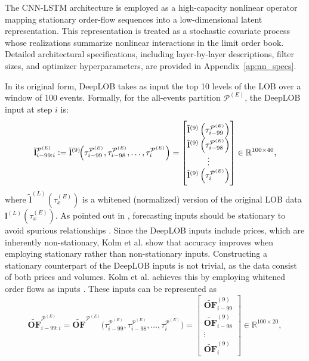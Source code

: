 \documentclass[10pt,a4paper,oneside]{article}
\begin{document}
The CNN-LSTM architecture is employed as a high-capacity nonlinear operator mapping stationary order-flow sequences into a low-dimensional latent representation. This representation is treated as a stochastic covariate process whose realizations summarize nonlinear interactions in the limit order book. Detailed architectural specifications, including layer-by-layer descriptions, filter sizes, and optimizer hyperparameters, are provided in Appendix~\ref{ap:nn_specs}.

In its original form, DeepLOB takes as input the top 10 levels of the LOB over a window of 100 events. Formally, for the all-events partition $\mathcal{P}^{(E)}$, the DeepLOB input at step $i$ is:
\[
    \tilde{\mathbf{l}}^{\mathcal{P}^{(E)}}_{i - 99 : i}
    :=
    \tilde{\mathbf{l}}^{(9)}\!\Bigl(\tau^{\mathcal{P}^{(E)}}_{i - 99}, \tau^{\mathcal{P}^{(E)}}_{i - 98}, \dots , \tau^{\mathcal{P}^{(E)}}_{i}\Bigr)
    =
    \begin{bmatrix}
        \tilde{\mathbf{l}}^{(9)}\left(\tau^{\mathcal{P}^{(E)}}_{i - 99}\right) \\
        \tilde{\mathbf{l}}^{(9)}\left(\tau^{\mathcal{P}^{(E)}}_{i - 98}\right) \\
        \vdots                                                                 \\
        \tilde{\mathbf{l}}^{(9)}\left(\tau^{\mathcal{P}^{(E)}}_{i}\right)
    \end{bmatrix}
    \in \mathbb{R}^{100 \times 40},
\]
where $\tilde{\mathbf{l}}^{(L)}(\tau^{(E)}_x)$ is a whitened (normalized) version of the original LOB data $\mathbf{l}^{(L)}(\tau^{(E)}_x)$. As pointed out in \cite{kolm2023deep}, forecasting inputs should be stationary to avoid spurious relationships \cite{granger1974spurious, phillips1986understanding}. Since the DeepLOB inputs include prices, which are inherently non-stationary, Kolm et al. \cite{kolm2023deep} show that accuracy improves when employing stationary rather than non-stationary inputs. Constructing a stationary counterpart of the DeepLOB inputs is not trivial, as the data consist of both prices and volumes. Kolm et al. \cite{kolm2023deep} achieves this by employing whitened order flows as inputs \cite{cont2013price, cont2023cross}. These inputs can be represented as
\[
    \widetilde{\mathbf{OF}}^{\mathcal{P}^{(E)}}_{i - 99:i}
    =
    \widetilde{\mathbf{OF}}^{\mathcal{P}^{(E)}}\!\bigl(\tau^{\mathcal{P}^{(E)}}_{i - 99}, \tau^{\mathcal{P}^{(E)}}_{i - 98}, \dots , \tau^{\mathcal{P}^{(E)}}_{i}\bigr)
    =
    \begin{bmatrix}
        \widetilde{\mathbf{OF}}^{(9)}_{i - 99} \\
        \widetilde{\mathbf{OF}}^{(9)}_{i - 98} \\
        \vdots                                 \\
        \widetilde{\mathbf{OF}}^{(9)}_i
    \end{bmatrix}
    \in \mathbb{R}^{100 \times 20},
\]
\end{document}
